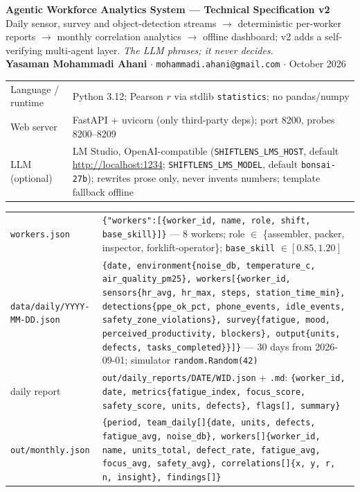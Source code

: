\documentclass[10pt,a4paper]{article}
\newcommand{\hd}[1]{\vspace{2.5pt}{\bfseries\color{slblue}#1}\par\vspace{1pt}}
\begin{document}
\begin{center}
{\Large\bfseries\color{slblue} Agentic Workforce Analytics System --- Technical Specification v2}\\[1pt]
{\small Daily sensor, survey and object-detection streams $\to$ deterministic per-worker
reports $\to$ monthly correlation analytics $\to$ offline dashboard; v2 adds a
self-verifying multi-agent layer. \emph{The LLM phrases; it never decides}.}\\[1pt]
{\small \textbf{Yasaman Mohammadi Ahani} \;$\cdot$\; \texttt{mohammadi.ahani@gmail.com} \;$\cdot$\; October 2026}
\end{center}
\vspace{-2pt}

\hd{Stack}
\begin{tabular}{@{}p{2.6cm}p{15.1cm}@{}}
Language / runtime & Python 3.12; Pearson $r$ via stdlib \texttt{statistics}; no pandas/numpy\\
Web server & FastAPI + uvicorn (only third-party deps); port 8200, probes 8200--8209\\
LLM (optional) & LM Studio, OpenAI-compatible (\texttt{SHIFTLENS\_LMS\_HOST}, default
\url{http://localhost:1234}; \texttt{SHIFTLENS\_LMS\_MODEL}, default \texttt{bonsai-27b});
rewrites prose only, never invents numbers; template fallback offline\\
\end{tabular}

\hd{Data schemas}
\begin{tabular}{@{}p{3.4cm}p{14.3cm}@{}}
\texttt{workers.json} & \texttt{\{"workers":[\{worker\_id, name, role, shift,
base\_skill\}]\}} --- 8 workers; role $\in$ \{assembler, packer, inspector,
forklift-operator\}; \texttt{base\_skill} $\in [0.85, 1.20]$\\
\texttt{data/daily/}\newline\texttt{YYYY-MM-DD.json} & \texttt{\{date, environment\{noise\_db,
temperature\_c, air\_quality\_pm25\}, workers[\{worker\_id, sensors\{hr\_avg, hr\_max,
steps, station\_time\_min\}, detections\{ppe\_ok\_pct, phone\_events, idle\_events,
safety\_zone\_violations\}, survey\{fatigue, mood, perceived\_productivity, blockers\},
output\{units, defects, tasks\_completed\}\}]\}} --- 30 days from 2026-09-01; simulator
\texttt{random.Random(42)}\\
daily report & \texttt{out/daily\_reports/DATE/WID.json} + \texttt{.md}:
\texttt{\{worker\_id, date, metrics\{fatigue\_index, focus\_score, safety\_score, units,
defects\}, flags[], summary\}}\\
\texttt{out/monthly.json} & \texttt{\{period, team\_daily[]\{date, units, defects,
fatigue\_avg, noise\_db\}, workers[]\{worker\_id, name, units\_total, defect\_rate,
fatigue\_avg, focus\_avg, safety\_avg\}, correlations[]\{x, y, r, n, insight\},
findings[]\}}\\
\end{tabular}
\end{document}
